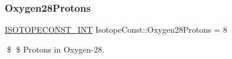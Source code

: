 \subsubsection{\texorpdfstring{Oxygen28\+Protons}{Oxygen28Protons}}
{\footnotesize\ttfamily \mbox{\hyperlink{group___isotope_const-_macros_ga5f18360b3e99483a35c32d789e62621c}{I\+S\+O\+T\+O\+P\+E\+C\+O\+N\+S\+T\+\_\+\+I\+NT}} Isotope\+Const\+::\+Oxygen28\+Protons = 8}

\$ \$ Protons in Oxygen-\/28. 
